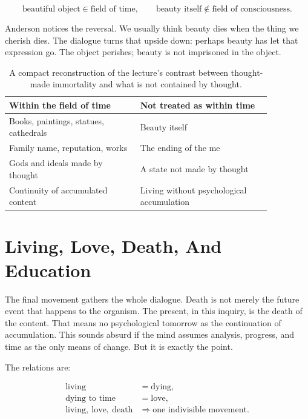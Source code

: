 \begin{equation}
\text{beautiful object} \in \text{field of time},
\qquad
\text{beauty itself} \notin \text{field of consciousness}.
\end{equation}

Anderson notices the reversal. We usually think beauty dies when the thing we cherish dies. The dialogue turns that upside down: perhaps beauty has let that expression go. The object perishes; beauty is not imprisoned in the object.

\begin{table}
\centering
\begin{tabular}{|p{0.43\linewidth}|p{0.43\linewidth}|}
\hline
Within the field of time & Not treated as within time \\
\hline
Books, paintings, statues, cathedrals & Beauty itself \\
\hline
Family name, reputation, works & The ending of the me \\
\hline
Gods and ideals made by thought & A state not made by thought \\
\hline
Continuity of accumulated content & Living without psychological accumulation \\
\hline
\end{tabular}
\caption{A compact reconstruction of the lecture's contrast between thought-made immortality and what is not contained by thought.}
\end{table}

\section{Living, Love, Death, And Education}

The final movement gathers the whole dialogue. Death is not merely the future event that happens to the organism. The present, in this inquiry, is the death of the content. That means no psychological tomorrow as the continuation of accumulation. This sounds absurd if the mind assumes analysis, progress, and time as the only means of change. But it is exactly the point.

The relations are:

\begin{align}
\text{living} &= \text{dying}, \\
\text{dying to time} &= \text{love}, \\
\text{living},\ \text{love},\ \text{death}
&\Rightarrow
\text{one indivisible movement}.
\end{align}


